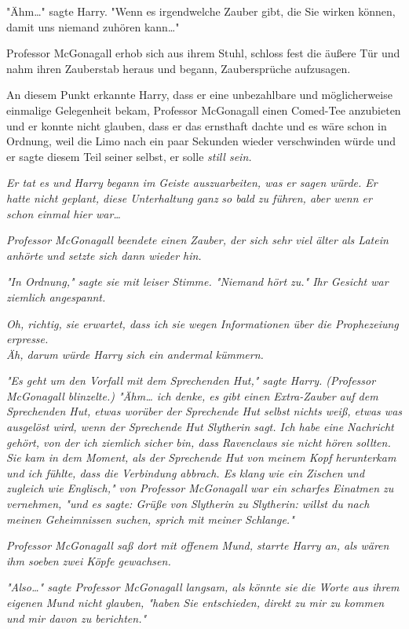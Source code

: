 {"Ähm…" sagte Harry. "Wenn es irgendwelche Zauber gibt, die Sie wirken können, damit uns niemand zuhören kann…"

Professor McGonagall erhob sich aus ihrem Stuhl, schloss fest die äußere Tür und nahm ihren Zauberstab heraus und begann, Zaubersprüche aufzusagen.

An diesem Punkt erkannte Harry, dass er eine unbezahlbare und möglicherweise einmalige Gelegenheit bekam, Professor McGonagall einen Comed-Tee anzubieten und er konnte nicht glauben, dass er das ernsthaft dachte und es wäre schon in Ordnung, weil die Limo nach ein paar Sekunden wieder verschwinden würde und er sagte diesem Teil seiner selbst, er solle \emph{still sein.}

\emph{Er tat es und Harry begann im Geiste auszuarbeiten, was er sagen würde. Er hatte nicht geplant, diese Unterhaltung} \emph{\emph{ganz}} \emph{so bald zu führen, aber wenn er schon einmal hier war…}

\emph{Professor McGonagall beendete einen Zauber, der sich sehr viel älter als Latein anhörte und setzte sich dann wieder hin.}

\emph{"In Ordnung," sagte sie mit leiser Stimme. "Niemand hört zu." Ihr Gesicht war ziemlich angespannt.}

\emph{\emph{Oh, richtig, sie erwartet, dass ich sie wegen Informationen über die Prophezeiung erpresse.}}\\ \emph{Äh, darum würde Harry sich ein andermal kümmern.}

\emph{"Es geht um den Vorfall mit dem Sprechenden Hut," sagte Harry. (Professor McGonagall blinzelte.) "Ähm… ich denke, es gibt einen Extra-Zauber auf dem Sprechenden Hut, etwas worüber der Sprechende Hut selbst nichts weiß, etwas was ausgelöst wird, wenn der Sprechende Hut Slytherin sagt. Ich habe eine Nachricht gehört, von der ich ziemlich sicher bin, dass Ravenclaws sie nicht hören sollten. Sie kam in dem Moment, als der Sprechende Hut von meinem Kopf herunterkam und ich fühlte, dass die Verbindung abbrach. Es klang wie ein Zischen und zugleich wie Englisch," von Professor McGonagall war ein scharfes Einatmen zu vernehmen, "und es sagte: Grüße von Slytherin zu Slytherin: willst du nach meinen Geheimnissen suchen, sprich mit meiner Schlange."}

\emph{Professor McGonagall saß dort mit offenem Mund, starrte Harry an, als wären ihm soeben zwei Köpfe gewachsen.}

\emph{"Also…" sagte Professor McGonagall langsam, als könnte sie die Worte aus ihrem eigenen Mund nicht glauben, "haben Sie entschieden, direkt zu mir zu kommen und mir davon zu berichten."}

}
